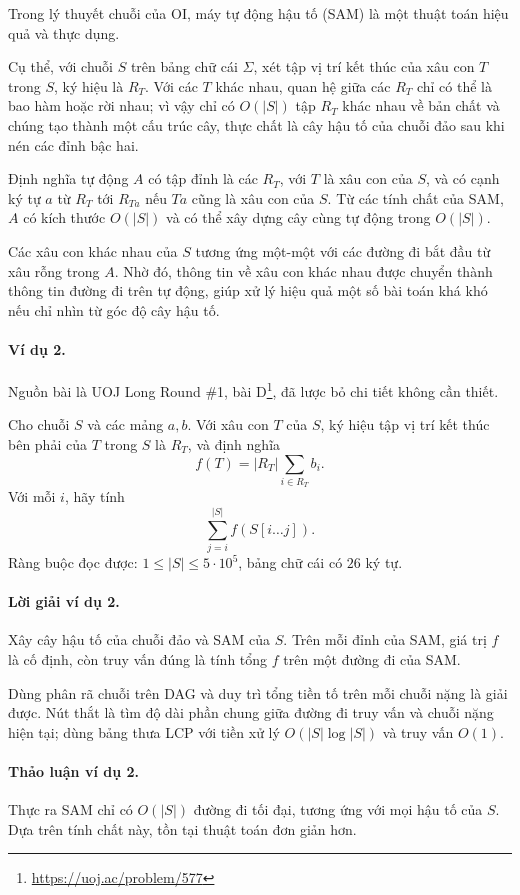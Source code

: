 \documentclass[11pt]{article}
\begin{document}
Trong lý thuyết chuỗi của OI, máy tự động hậu tố (SAM) là một thuật toán hiệu
quả và thực dụng.

Cụ thể, với chuỗi $S$ trên bảng chữ cái $\Sigma$, xét tập vị trí kết thúc của
xâu con $T$ trong $S$, ký hiệu là $R_T$. Với các $T$ khác nhau, quan hệ giữa các
$R_T$ chỉ có thể là bao hàm hoặc rời nhau; vì vậy chỉ có $O(|S|)$ tập $R_T$ khác
nhau về bản chất và chúng tạo thành một cấu trúc cây, thực chất là cây hậu tố
của chuỗi đảo sau khi nén các đỉnh bậc hai.

Định nghĩa tự động $A$ có tập đỉnh là các $R_T$, với $T$ là xâu con của $S$, và
có cạnh ký tự $a$ từ $R_T$ tới $R_{Ta}$ nếu $Ta$ cũng là xâu con của $S$. Từ các
tính chất của SAM, $A$ có kích thước $O(|S|)$ và có thể xây dựng cây cùng tự động
trong $O(|S|)$.

Các xâu con khác nhau của $S$ tương ứng một-một với các đường đi bắt đầu từ xâu
rỗng trong $A$. Nhờ đó, thông tin về xâu con khác nhau được chuyển thành thông
tin đường đi trên tự động, giúp xử lý hiệu quả một số bài toán khá khó nếu chỉ
nhìn từ góc độ cây hậu tố.

\paragraph{Ví dụ 2.}
Nguồn bài là UOJ Long Round \#1, bài D\footnote{\url{https://uoj.ac/problem/577}},
đã lược bỏ chi tiết không cần thiết.

Cho chuỗi $S$ và các mảng $a,b$. Với xâu con $T$ của $S$, ký hiệu tập vị trí kết
thúc bên phải của $T$ trong $S$ là \(R_T\), và định nghĩa
\[
  f(T)=|R_T|\sum_{i\in R_T} b_i.
\]
Với mỗi \(i\), hãy tính
\[
  \sum_{j=i}^{|S|} f(S[i\ldots j]).
\]
Ràng buộc đọc được: \(1\le |S|\le 5\cdot 10^5\), bảng chữ cái có \(26\) ký tự.

\paragraph{Lời giải ví dụ 2.}
Xây cây hậu tố của chuỗi đảo và SAM của $S$. Trên mỗi đỉnh của SAM, giá trị
$f$ là cố định, còn truy vấn đúng là tính tổng $f$ trên một đường đi của SAM.

Dùng phân rã chuỗi trên DAG và duy trì tổng tiền tố trên mỗi chuỗi nặng là giải
được. Nút thắt là tìm độ dài phần chung giữa đường đi truy vấn và chuỗi nặng
hiện tại; dùng bảng thưa LCP với tiền xử lý $O(|S|\log |S|)$ và truy vấn $O(1)$.

\paragraph{Thảo luận ví dụ 2.}
Thực ra SAM chỉ có $O(|S|)$ đường đi tối đại, tương ứng với mọi hậu tố của $S$.
Dựa trên tính chất này, tồn tại thuật toán đơn giản hơn.
\end{document}
